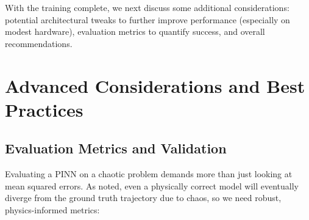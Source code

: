 \documentclass{article}
\begin{document}

With the training complete, we next discuss some additional considerations: potential architectural 
tweaks to further improve performance (especially on modest hardware), evaluation metrics to quantify success, and overall recommendations. 

\section{Advanced Considerations and Best Practices}

\subsection{Evaluation Metrics and Validation}

Evaluating a PINN on a chaotic problem demands more than just looking at mean squared errors.  As noted, even a physically correct model will eventually diverge from the ground truth trajectory due to chaos, so we need robust, physics-informed metrics:
\end{document}

